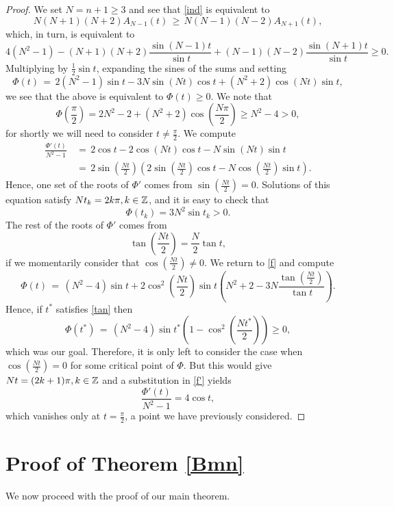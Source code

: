 \documentclass[11pt,reqno]{amsart}
\theoremstyle{plain}
\theoremstyle{definition}
\theoremstyle{remark}
\newcommand{\be}{\begin{equation}}
\newcommand{\ee}{\end{equation}}
\begin{document}
\begin{proof}
We set $N=n+1\geq3$ and see that \eqref{ind} is equivalent to 
$$
N(N+1)(N+2)A_{N-1}(t) \, \geq \, N(N-1)(N-2)A_{N+1}(t),
$$
which, in turn, is equivalent to
$$
4(N^2-1) -(N+1)(N+2)\frac{\sin(N-1)t}{\sin t} +(N-1)(N-2)\frac{\sin(N+1)t}{\sin t} \geq 0.
$$
Multiplying by $\frac{1}{2}\sin t$, expanding the sines of the sums and setting
\be \label{f}
\Phi(t) \, = \, 2(N^2-1)\sin t -3N \sin(Nt) \cos t +(N^2+2) \cos(Nt) \sin t,
\ee
we see that the above is equivalent to $\Phi(t)\geq 0$. We note that 
$$
\Phi\left(\frac{\pi}{2}\right) = 2N^2-2 +(N^2+2) \cos\left(\frac{N\pi}{2}\right) \geq N^2-4 >0,
$$
for shortly we will need to consider $t\neq \frac{\pi}{2}$. We compute
\begin{align} \label{f'}
\frac{\Phi'(t)}{N^2-1} \, & = \, 2\cos t -2\cos(Nt) \cos t -N \sin(Nt) \sin t \nonumber \\
& = \, 2 \sin\left(\frac{Nt}{2}\right) \left( 2 \sin\left(\frac{Nt}{2}\right) \cos t  -N \cos\left(\frac{Nt}{2}\right) \sin t  \right). 
\end{align}
Hence, one set of the roots of $\Phi'$ comes from $\sin\left(\frac{Nt}{2}\right) = 0$. Solutions of this equation satisfy $Nt_k = 2k\pi, k\in{\mathbb Z}$, and it is easy to check that
$$
\Phi(t_k) = 3N^2 \sin t_k > 0.
$$
The rest of the roots of $\Phi'$ comes from 
\be \label{tan}
\tan\left(\frac{Nt}{2}\right) = \frac{N}{2} \tan t,
\ee
if we momentarily consider that $\cos\left(\frac{Nt}{2}\right) \neq 0$. We return to \eqref{f} and compute 
$$
\Phi(t) \, = \, (N^2-4)\sin t + 2 \cos^2\left(\frac{Nt}{2}\right) \sin t \left( N^2+2 -3N\frac{\tan\left(\frac{Nt}{2}\right)}{\tan t} \right).
$$
Hence, if $t^*$ satisfies \eqref{tan} then 
$$
\Phi(t^*) \, = \, (N^2-4)\sin t^* \left( 1-  \cos^2\left(\frac{Nt^*}{2}\right) \right) \geq 0, 
$$
which was our goal. Therefore, it is only left to consider the case when $\cos\left(\frac{Nt}{2}\right) = 0$ for some critical point of $\Phi$. But this would give $Nt=(2k+1)\pi,k\in{\mathbb Z}$ and a substitution in \eqref{f'} yields
$$
\frac{\Phi'(t)}{N^2-1} = 4 \cos t,
$$
which vanishes only at $t=\frac{\pi}{2}$, a point we have previously considered. 
\end{proof}

\vskip0.3cm
\section{Proof of Theorem \ref{Bmn}}
We now proceed with the proof of our main theorem. 
\end{document}
